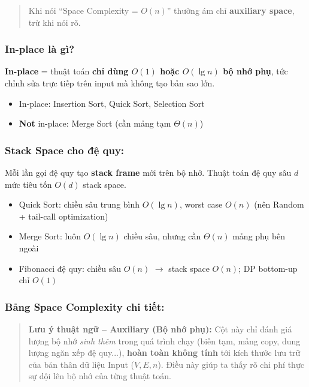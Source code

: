 \documentclass[10pt]{article}
\providecommand{\tightlist}{\setlength{\itemsep}{0pt}\setlength{\parskip}{0pt}}
\begin{document}
\begin{quote}
Khi nói ``Space Complexity = $O(n)$'' thường ám chỉ \textbf{auxiliary space}, trừ khi nói rõ.
\end{quote}

\subsubsection{In-place là gì?}

\textbf{In-place} = thuật toán \textbf{chỉ dùng $O(1)$ hoặc $O(\lg n)$ bộ nhớ phụ}, tức chỉnh sửa trực tiếp trên input mà không tạo bản sao lớn.

\begin{itemize}
\tightlist
\item In-place: Insertion Sort, Quick Sort, Selection Sort
\item \textbf{Not} in-place: Merge Sort (cần mảng tạm $\Theta(n)$)
\end{itemize}

\subsubsection{Stack Space cho đệ quy:}

Mỗi lần gọi đệ quy tạo \textbf{stack frame} mới trên bộ nhớ. Thuật toán đệ quy sâu $d$ mức tiêu tốn $O(d)$ stack space.

\begin{itemize}
\tightlist
\item Quick Sort: chiều sâu trung bình $O(\lg n)$, worst case $O(n)$ \quad (nên Random + tail-call optimization)
\item Merge Sort: luôn $O(\lg n)$ chiều sâu, nhưng cần $\Theta(n)$ mảng phụ bên ngoài
\item Fibonacci đệ quy: chiều sâu $O(n)$ $\to$ stack space $O(n)$; DP bottom-up chỉ $O(1)$
\end{itemize}

\subsubsection{Bảng Space Complexity chi tiết:}\label{bang-space-complexity}

\begin{quote}
\textbf{Lưu ý thuật ngữ -- Auxiliary (Bộ nhớ phụ):} Cột này chỉ đánh giá lượng bộ nhớ \textit{sinh thêm} trong quá trình chạy (biến tạm, mảng copy, dung lượng ngăn xếp đệ quy...), \textbf{hoàn toàn không tính} tới kích thước lưu trữ của bản thân dữ liệu Input ($V, E, n$). Điều này giúp ta thấy rõ chi phí thực sự dội lên bộ nhớ của từng thuật toán.
\end{quote}
\end{document}
